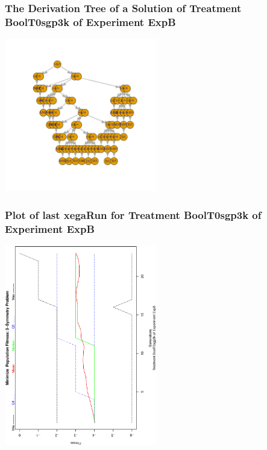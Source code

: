 \documentclass[18pt,c]{beamer}
\begin{document}
 \begin{frame}
 \frametitle{ The Derivation Tree of a Solution of Treatment BoolT0sgp3k of Experiment ExpB }
 \begin{center}
\includegraphics[width=0.5\textwidth, angle=0]
{ExpBDerivationTreeFigure001.pdf}
 \end{center}
 \label{report/ExpBDerivationTreeFigure001.pdf}  
 \end{frame}

 \begin{frame}
 \frametitle{ Plot of last xegaRun for Treatment BoolT0sgp3k of Experiment ExpB }
 \begin{center}
\includegraphics[width=0.5\textwidth, angle=-90]
{ExpBPlotPopStatsFigure001.eps}
 \end{center}
 \label{report/ExpBPlotPopStatsFigure001.eps}  
 \end{frame}
\end{document}
